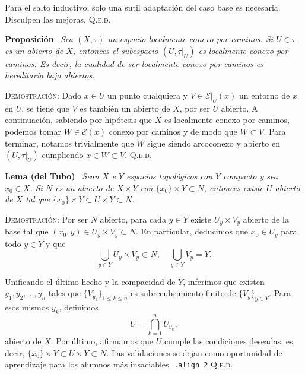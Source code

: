 \documentclass[11pt]{article}
\begin{document}
Para el salto inductivo, solo una sutil adaptación del caso base es necesaria. Disculpen las mejoras. \hfill{\textsc{Q.e.d.}}

\bigskip

\noindent\textbf{Proposición} \, \textit{Sea $(X, \tau)$ un espacio localmente conexo por caminos. Si $U \in \tau$ es un abierto de $X$, entonces el subespacio $(U, \tau\vert_{ U})$ es localmente conexo por caminos. Es decir, la cualidad de ser localmente conexo por caminos es hereditaria bajo abiertos.}

\vspace{5px}

\noindent\textsc{Demostración}: Dado $x \in U$ un punto cualquiera y $V \in \mathcal{E}\vert_{U}(x)$ un entorno de $x$ en $U$, se tiene que $V$ es también un abierto de $X$, por ser $U$ abierto. A continuación, sabiendo por hipótesis que $X$ es localmente conexo por caminos, podemos tomar $W \in \mathcal{E}(x)$ conexo por caminos y de modo que $W \subset V$. Para terminar, notamos trivialmente que $W$ sigue siendo arcoconexo y abierto en $(U, \tau\vert_{U})$ cumpliendo $x \in W \subset V$. \hfill{\textsc{Q.e.d.}}

\bigskip

\noindent\textbf{Lema (del Tubo)} \, \textit{Sean $X$ e $Y$ espacios topológicos con $Y$ compacto y sea $x_0 \in X$. Si $N$ es un abierto de $X \times Y$ con $\{x_0\} \times Y \subset N$, entonces existe $U$ abierto de $X$ tal que $\{x_0\} \times Y \subset U \times Y \subset N$.}

\medskip

\noindent\textsc{Demostración}: Por ser $N$ abierto, para cada $y \in Y$ existe $U_y \times V_y$ abierto de la base tal que $(x_0, y) \in U_y \times V_y \subset N$. En particular, deducimos que $x_0 \in U_y$ para todo $y \in Y$ y que \[\bigcup_{y \in Y} U_y \times V_y \subset N, \quad \bigcup_{y \in Y} V_y = Y.\]

Unificando el último hecho y la compacidad de $Y$, inferimos que existen $y_1, y_2, ..., y_n$ tales que $\{V_{y_k}\}_{1 \leq k \leq n}$ es subrecubrimiento finito de $\{V_y\}_{y \in Y}$. Para esos mismos $y_k$, definimos \[U = \bigcap_{k=1}^{n} U_{y_k},\] abierto de $X$. Por último, afirmamos que $U$ cumple las condiciones deseadas, es decir, $\{x_0\} \times Y \subset U \times Y \subset N$. Las validaciones se dejan como oportunidad de aprendizaje para los alumnos más insaciables. \texttt{.align 2} \hfill{\textsc{Q.e.d.}}

\bigskip
\end{document}
